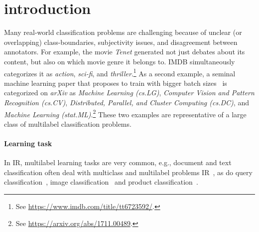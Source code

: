 
\section{introduction}
\label{sec:org662677c}


Many real-world classification problems are challenging because of unclear (or overlapping) class-boundaries, subjectivity issues, and disagreement between annotators.
For example, the movie \textit{Tenet} generated not just debates about its content, but also on which movie genre it belongs to. IMDB simultaneously categorizes it as \textit{action}, \textit{sci-fi}, and \textit{thriller}.\footnote{See \url{https://www.imdb.com/title/tt6723592/}.}
As a second example, a seminal machine learning paper that proposes to train with bigger batch sizes~\citep{bigBSArxiv} is categorized on \textit{arXiv} as \textit{Machine Learning (cs.LG)},
\textit{Computer Vision and Pattern Recognition (cs.CV)}, \textit{Distributed,
Parallel, and Cluster Computing (cs.DC)}, and \textit{Machine Learning
(stat.ML)}.\footnote{See \url{https://arxiv.org/abs/1711.00489}.}
These two examples are representative of a large class of multilabel classification problems.

\begin{comment}
\begin{enumerate}[label=(\arabic*),leftmargin=*]
\item The possibility of assigning more than one label to a single instance is desirable (i.e., labels are not mutually exclusive).
\item The instance being labeled needs to be inspected or consumed in its entirety before a full set of class labels can be determined. For example, it requires an entire viewing of the movie \textit{Tenet} to determine if the label \textit{romance} is appropriate, as it is arguably the underlying driver of the protagonists.
\item The number of labels differs per instance, making the number of labels to assign at inference time unknown.
\end{enumerate}
\end{comment}

\paragraph{Learning task}
In \ac{IR}, multilabel learning tasks are very common, e.g., document and text classification often deal with multiclass and multilabel problems \ac{IR}~\cite{IRClassStat, textCategorization, statTextCategorization, documentClassification}, as do query classification~\cite{queryClassification, introIR}, image classification~\cite{imageClassification, faceDetection} and product classification~\cite{Amoualian2020SIGIR2E}. 

